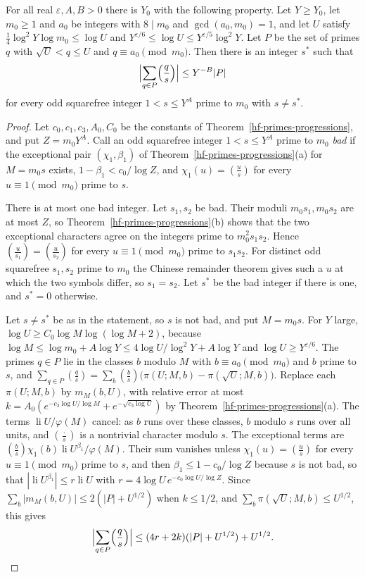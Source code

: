 \begin{lemma}\label{hf-twisted-prime-sums}
For all real $\varepsilon,A,B>0$ there is $Y_0$ with the following property. Let $Y\geq Y_0$, let
$m_0\geq1$ and $a_0$ be integers with $8\mid m_0$ and $\gcd(a_0,m_0)=1$, and let $U$ satisfy
$\frac14\log^2Y\log m_0\leq\log U$ and $Y^{\varepsilon/6}\leq\log U\leq Y^{\varepsilon/5}\log^2Y$.
Let $P$ be the set of primes $q$ with $\sqrt U<q\leq U$ and $q\equiv a_0\pmod{m_0}$. Then there is
an integer $s^*$ such that
\[
 \Bigl|\sum_{q\in P}\Bigl(\frac qs\Bigr)\Bigr|\leq Y^{-B}|P|
\]
for every odd squarefree integer $1<s\leq Y^A$ prime to $m_0$ with $s\neq s^*$.
\end{lemma}

\begin{proof}
Let $c_0,c_1,c_3,A_0,C_0$ be the constants of Theorem~\ref{hf-primes-progressions}, and put
$Z=m_0Y^A$. Call an odd squarefree integer $1<s\leq Y^A$ prime to $m_0$ \emph{bad} if the
exceptional pair $(\chi_1,\beta_1)$ of Theorem~\ref{hf-primes-progressions}(a) for $M=m_0s$ exists,
$1-\beta_1<c_0/\log Z$, and $\chi_1(u)=\left(\frac us\right)$ for every $u\equiv1\pmod{m_0}$ prime to
$s$.

There is at most one bad integer. Let $s_1,s_2$ be bad. Their moduli $m_0s_1,m_0s_2$ are at most
$Z$, so Theorem~\ref{hf-primes-progressions}(b) shows that the two exceptional characters agree on
the integers prime to $m_0^2s_1s_2$. Hence $\left(\frac u{s_1}\right)=\left(\frac u{s_2}\right)$ for
every $u\equiv1\pmod{m_0}$ prime to $s_1s_2$. For distinct odd squarefree $s_1,s_2$ prime to $m_0$
the Chinese remainder theorem gives such a $u$ at which the two symbols differ, so $s_1=s_2$. Let
$s^*$ be the bad integer if there is one, and $s^*=0$ otherwise.

Let $s\neq s^*$ be as in the statement, so $s$ is not bad, and put $M=m_0s$. For $Y$ large,
$\log U\geq C_0\log M\log(\log M+2)$, because $\log M\leq\log m_0+A\log Y\leq4\log U/\log^2Y+A\log Y$
and $\log U\geq Y^{\varepsilon/6}$. The primes $q\in P$ lie in the classes $b$ modulo $M$ with
$b\equiv a_0\pmod{m_0}$ and $b$ prime to $s$, and
$\sum_{q\in P}\left(\frac qs\right)=\sum_b\left(\frac bs\right)\bigl(\pi(U;M,b)-\pi(\sqrt U;M,b)\bigr)$.
Replace each $\pi(U;M,b)$ by $m_M(b,U)$, with relative error at most
$k=A_0(e^{-c_3\log U/\log M}+e^{-\sqrt{c_3\log U}})$ by Theorem~\ref{hf-primes-progressions}(a).
The terms $\operatorname{li}U/\varphi(M)$ cancel: as $b$ runs over these classes, $b$ modulo $s$ runs
over all units, and $\left(\frac{\cdot}{s}\right)$ is a nontrivial character modulo $s$. The
exceptional terms are $\left(\frac bs\right)\chi_1(b)\operatorname{li}U^{\beta_1}/\varphi(M)$. Their
sum vanishes unless $\chi_1(u)=\left(\frac us\right)$ for every $u\equiv1\pmod{m_0}$ prime to $s$, and
then $\beta_1\leq1-c_0/\log Z$ because $s$ is not bad, so that
$|\operatorname{li}U^{\beta_1}|\leq r\operatorname{li}U$ with $r=4\log U\,e^{-c_0\log U/\log Z}$.
Since $\sum_b|m_M(b,U)|\leq2(|P|+U^{1/2})$ when $k\leq1/2$, and $\sum_b\pi(\sqrt U;M,b)\leq U^{1/2}$,
this gives
\[
 \Bigl|\sum_{q\in P}\Bigl(\frac qs\Bigr)\Bigr|\leq(4r+2k)(|P|+U^{1/2})+U^{1/2}.
\]


\end{proof}

